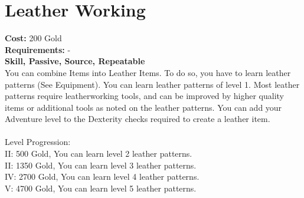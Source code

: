 \section{Leather Working}
\textbf{Cost:} 200 Gold\\
\textbf{Requirements:} -\\
\textbf{Skill, Passive, Source, Repeatable}\\
You can combine Items into Leather Items. To do so, you have to learn leather patterns (See Equipment). You can learn leather patterns of level 1. Most leather patterns require leatherworking tools, and can be improved by higher quality items or additional tools as noted on the leather patterns. You can add your Adventure level to the Dexterity checks required to create a leather item.\\
\\
Level Progression:\\
II: 500 Gold, You can learn level 2 leather patterns.\\
II: 1350 Gold, You can learn level 3 leather patterns.\\
IV: 2700 Gold, You can learn level 4 leather patterns.\\
V: 4700 Gold, You can learn level 5 leather patterns.\\